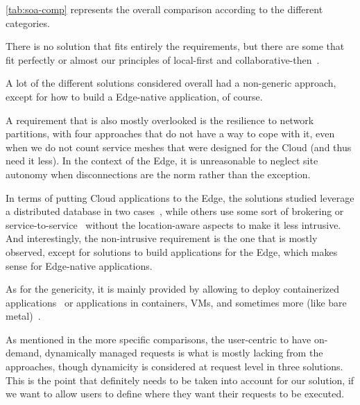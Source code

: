 \autoref{tab:soa-comp} represents the overall comparison according to
the different categories.

There is no solution that fits entirely the requirements,
but there are some that fit perfectly or almost our principles of
local-first and
collaborative-then~\cite{TSS21,IRPCM22,SGDR21,openyurt,SYHJ17}.

A lot of the different solutions considered overall had a
non-generic approach, except for how to build a Edge-native
application, of course.


A requirement that is also mostly overlooked is the resilience to
network partitions, with four approaches that do not have a way to
cope with it, even when we do not count service meshes that were
designed for the Cloud (and thus need it less).
%
In the context of the Edge, it is unreasonable to neglect site
autonomy when disconnections are the norm rather than the exception.


In terms of putting Cloud applications to the Edge, the solutions
studied leverage a distributed database in two
cases~\cite{Spataru20,TSS21}, while others use some sort of brokering
or service-to-service~\cite{SYHJ17, WFGI+19} without the
location-aware aspects to make it less intrusive.
%
And interestingly, the non-intrusive requirement is the one that is
mostly observed, except for solutions to build applications for the
Edge, which makes sense for Edge-native applications.

As for the genericity, it is mainly provided by allowing to deploy
containerized applications~\cite{IRPCM22, JS20, openyurt, linkerd,
  SS20} or applications in containers, VMs, and sometimes more (like
bare metal)~\cite{Spataru20, SGDR21}.

As mentioned in the more specific comparisons, the user-centric to
have on-demand, dynamically managed requests is what is mostly lacking
from the approaches, though dynamicity is considered
at request level in three solutions.
%
This is the point that definitely needs to be taken into account for
our solution, if we want to allow users to define where they want
their requests to be executed.




